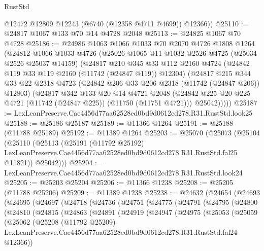 \begin{lexlean}{RustStd}
\begin{coremodule}
        @12472
        @12809
        @12243
        (@6740 (@12358 @4711 @4699))
        @12366))
@25110 := @24817 @1067 @133 @70 @14 @4728 @2048
@25113 := @24825 @1067 @70 @4728
@25186 := @24986
    @1063
    @1066
    @1033
    @70
    @2070
    @4726
    @1808
    @1264
    (@24812
      @1066
      @1033
      @4726
      (@25026
        @1065
        @11
        @1032
        @2526
        @4725
        (@25034 @2526 @25037 @14159)
        (@24817
          @210
          @345
          @33
          @112
          @2160
          @4724
          (@24842 @119 @33 @119 @2160 (@11742 (@24847 @119)) @12304)
          (@24817
            @215
            @344
            @33
            @22
            @2318
            @4723
            (@24842 @206 @33 @206 @2318 (@11742 (@24847 @206)) @12803)
            (@24817
              @342
              @133
              @20
              @14
              @4721
              @2048
              (@24842 @225 @20 @225 @4721 (@11742 (@24847 @225)) (@11750 (@11751 @4721)))
              @25042)))))
@25187 := LexLeanPreserve.Cae4456d77aa62528ed0bd9d0612cd278.R31.RustStd.look25
@25188 := @25186 @25187
@25189 := @11366 @1264
@25191 := @25188 (@11788 @25189)
@25192 := @11389 @1264
@25203 := @25070
    (@25073
      (@25104
        (@25110
          (@25113
            (@25191
              (@11792 @25192)
              LexLeanPreserve.Cae4456d77aa62528ed0bd9d0612cd278.R31.RustStd.fal25
              @11821))
          @25042)))
@25204 := LexLeanPreserve.Cae4456d77aa62528ed0bd9d0612cd278.R31.RustStd.look24
@25205 := @25203 @25204
@25206 := @11366 @1238
@25208 := @25205 (@11788 @25206)
@25209 := @11389 @1238
@25238 := @24632
    (@24654
      (@24693
        (@24695
          (@24697
            (@24718
              (@24736
                (@24751
                  (@24775
                    (@24791
                      (@24795
                        (@24800
                          (@24810
                            (@24815
                              (@24863
                                (@24891
                                  (@24919
                                    (@24947
                                      (@24975
                                        (@25053
                                          (@25059
                                            (@25062
                                              (@25208
                                                (@11792 @25209)
                                                LexLeanPreserve.Cae4456d77aa62528ed0bd9d0612cd278.R31.RustStd.fal24
                                                @12366))

\end{coremodule}
\end{lexlean}
